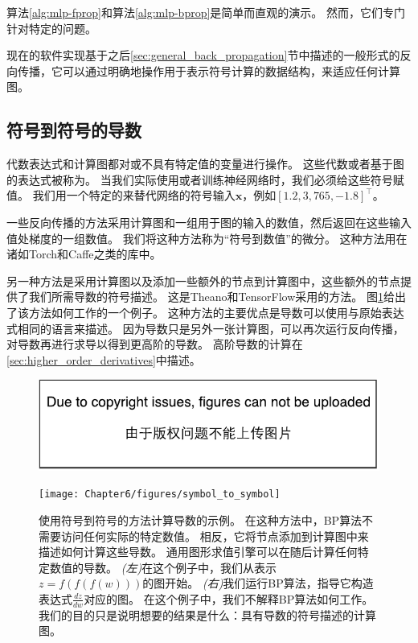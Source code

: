 算法\ref{alg:mlp-fprop}和算法\ref{alg:mlp-bprop}是简单而直观的演示。
然而，它们专门针对特定的问题。

现在的软件实现基于之后\ref{sec:general_back_propagation}节中描述的一般形式的反向传播，它可以通过明确地操作用于表示符号计算的数据结构，来适应任何计算图。



\subsection{符号到符号的导数}
\label{sec:symbol_to_symbol_derivatives}

代数表达式和计算图都对或不具有特定值的变量进行操作。
这些代数或者基于图的表达式被称为。
当我们实际使用或者训练神经网络时，我们必须给这些符号赋值。
我们用一个特定的来替代网络的符号输入$\bm{x}$，例如$[1.2, 3,765, -1.8]^\top$。

一些反向传播的方法采用计算图和一组用于图的输入的数值，然后返回在这些输入值处梯度的一组数值。
我们将这种方法称为``符号到数值''的微分。
这种方法用在诸如Torch\citep{Torch-2011}和Caffe\citep{Jia13caffe}之类的库中。

 
另一种方法是采用计算图以及添加一些额外的节点到计算图中，这些额外的节点提供了我们所需导数的符号描述。
这是Theano\citep{bergstra+al:2010-scipy-small,Bastien-Theano-2012}和TensorFlow\citep{tensorflow}采用的方法。
图\ref{fig:chap6_symbol_to_symbol}给出了该方法如何工作的一个例子。
这种方法的主要优点是导数可以使用与原始表达式相同的语言来描述。
因为导数只是另外一张计算图，可以再次运行反向传播，对导数再进行求导以得到更高阶的导数。
高阶导数的计算在\ref{sec:higher_order_derivatives}中描述。
\begin{figure}[!htb]
\ifOpenSource
\centerline{\includegraphics{figure.pdf}}
\else
\centerline{\texttt{[image: Chapter6/figures/symbol\_to\_symbol]}}
\fi
\captionsetup{singlelinecheck=off}
\caption{使用符号到符号的方法计算导数的示例。
在这种方法中，\gls{BP}算法不需要访问任何实际的特定数值。
相反，它将节点添加到计算图中来描述如何计算这些导数。
通用图形求值引擎可以在随后计算任何特定数值的导数。
\emph{(左)}在这个例子中，我们从表示$z=f(f(f(w)))$的图开始。
\emph{(右)}我们运行\gls{BP}算法，指导它构造表达式$\frac{dz}{dw}$对应的图。 在这个例子中，我们不解释\gls{BP}算法如何工作。
我们的目的只是说明想要的结果是什么：具有导数的符号描述的计算图。}
\label{fig:chap6_symbol_to_symbol}
\end{figure}

